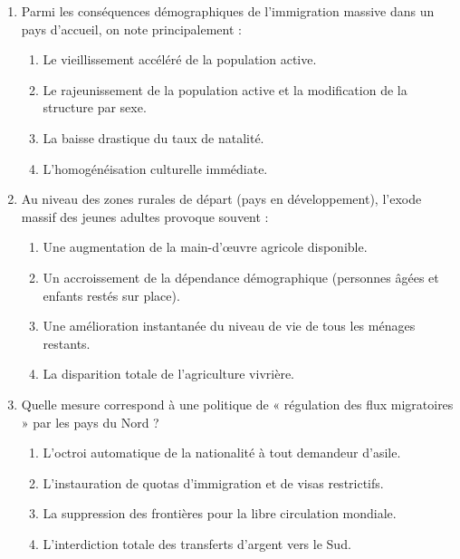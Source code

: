 \documentclass[11pt]{article}
\begin{document}
\begin{exercice}
\begin{enumerate}
    \item Parmi les conséquences démographiques de l'immigration massive dans un pays d'accueil, on note principalement :
    \begin{enumerate}
        \item Le vieillissement accéléré de la population active.
        \item Le rajeunissement de la population active et la modification de la structure par sexe.
        \item La baisse drastique du taux de natalité.
        \item L'homogénéisation culturelle immédiate.
    \end{enumerate}
    
    \item Au niveau des zones rurales de départ (pays en développement), l'exode massif des jeunes adultes provoque souvent :
    \begin{enumerate}
        \item Une augmentation de la main-d'œuvre agricole disponible.
        \item Un accroissement de la dépendance démographique (personnes âgées et enfants restés sur place).
        \item Une amélioration instantanée du niveau de vie de tous les ménages restants.
        \item La disparition totale de l'agriculture vivrière.
    \end{enumerate}
    
    \item Quelle mesure correspond à une politique de « régulation des flux migratoires » par les pays du Nord ?
    \begin{enumerate}
        \item L'octroi automatique de la nationalité à tout demandeur d'asile.
        \item L'instauration de quotas d'immigration et de visas restrictifs.
        \item La suppression des frontières pour la libre circulation mondiale.
        \item L'interdiction totale des transferts d'argent vers le Sud.
    \end{enumerate}
\end{enumerate}
\end{exercice}
\end{document}
